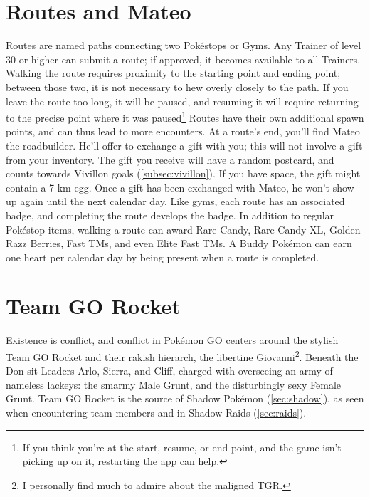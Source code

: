 \section{Routes and Mateo}
Routes are named paths connecting two Pokéstops or Gyms.
Any Trainer of level 30 or higher can submit a route; if approved, it becomes available to all Trainers.
Walking the route requires proximity to the starting point and ending point; between those two,
 it is not necessary to hew overly closely to the path.
If you leave the route too long, it will be paused, and resuming it will require returning to the precise
 point where it was paused\footnote{If you think you're at the start, resume, or end point, and the game isn't picking
 up on it, restarting the app can help.}
Routes have their own additional spawn points, and can thus lead to more encounters.
At a route's end, you'll find Mateo the roadbuilder.
He'll offer to exchange a gift with you; this will not involve a gift from your inventory.
The gift you receive will have a random postcard, and counts towards Vivillon goals (\autoref{subsec:vivillon}).
If you have space, the gift might contain a 7 km egg.
Once a gift has been exchanged with Mateo, he won't show up again until the next calendar day.
Like gyms, each route has an associated badge, and completing the route develops the badge.
In addition to regular Pokéstop items, walking a route can award Rare Candy, Rare Candy XL,
 Golden Razz Berries, Fast TMs, and even Elite Fast TMs.
A Buddy Pokémon can earn one heart per calendar day by being present when a route is completed.

\section{Team GO Rocket\label{sec:gorocket}}
Existence is conflict, and conflict in Pokémon GO centers around the stylish Team GO Rocket
 and their rakish hierarch, the libertine Giovanni\footnote{I personally find much to admire about the maligned TGR.}.
Beneath the Don sit Leaders Arlo, Sierra, and Cliff, charged with overseeing an army
 of nameless lackeys: the smarmy Male Grunt, and the disturbingly sexy Female Grunt.
Team GO Rocket is the source of Shadow Pokémon (\autoref{sec:shadow}),
 as seen when encountering team members and in Shadow Raids (\autoref{sec:raids}).

